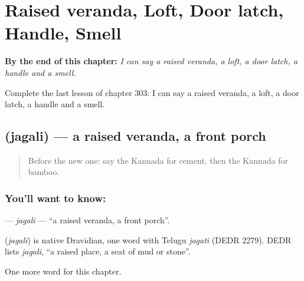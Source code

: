 
\chapter{Raised veranda, Loft, Door latch, Handle, Smell}
\label{ch:ka-raised-veranda-loft-door-latch-handle-smell}

\begin{chapteropening}
\textbf{By the end of this chapter:} \emph{I can say a raised veranda, a loft, a door latch, a handle and a smell.}

Complete the last lesson of chapter 303: I can say a raised veranda, a loft, a door latch, a handle and a smell.
\end{chapteropening}

\section[\texorpdfstring{\kn{ಜಗಲಿ} (jagali)}{ಜಗಲಿ (jagali)}]{ (jagali) — a raised veranda, a front porch}

\label{lesson:KA-C303-jagali}



\begin{quote}
Before the new one: say the Kannada for cement, then the Kannada for bamboo.
\end{quote}

\subsection*{You'll want to know: }
\textbf{} — \emph{jagali} — \textquotedblleft{}a raised veranda, a front porch\textquotedblright{}.

\begin{cousinweb}
\textbf{} (\emph{jagali}) is native Dravidian, one word with Telugu \emph{jagati} (DEDR 2279). DEDR lists \emph{jagali}, \textquotedblleft{}a raised place, a seat of mud or stone\textquotedblright{}.
\end{cousinweb}

\begin{grammarlens}[title={What you've built}]
One more word for this chapter.
\end{grammarlens}

